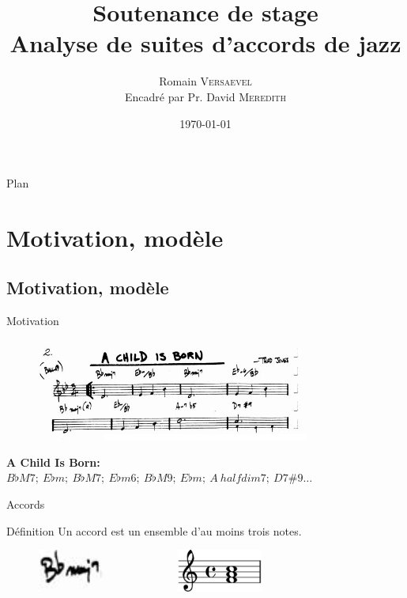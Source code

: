 \documentclass[10pt]{beamer}
\title[Analyse de suites d'accords de jazz]{\large Soutenance de stage \\ \Large Analyse de suites d'accords de jazz}
\institute{ENS de Lyon, M1 Informatique fondamentale}
\author[R. Versaevel]{\normalsize Romain \textsc{Versaevel}\newline \\ \normalsize Encadré par Pr. David \textsc{Meredith}}
\date{\today}
\begin{document}
\begin{frame}
\titlepage
\end{frame}

\begin{frame}{Plan}
\tableofcontents
\end{frame}

\section{Motivation, modèle}
\subsection{Motivation, modèle}

\begin{frame}{Motivation}
\begin{figure}
\centering
\includegraphics[width = 9cm]{images/achildisborn.jpg}
\end{figure} \bigskip \pause

\begin{block}{\textbf{A Child Is Born: }}
$B\flat M7;~E\flat m;~B\flat M7;~E\flat m6;~B\flat M9;~E\flat m;~A~halfdim7;~D 7\#9\dots$
\end{block}

\end{frame}

\begin{frame}{Accords}
\begin{block}{Définition}
Un accord est un ensemble d'au moins trois notes.
\end{block} \bigskip \pause

\begin{figure}
\centering
\includegraphics[height = 1.4cm]{images/chordletter.jpg} ~~~~~~~~~~~~
\includegraphics[height = 1.4cm]{images/chordstaff.jpg}
\end{figure} \bigskip

\end{frame}
\end{document}
